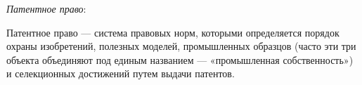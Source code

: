 \textit{Патентное право}:

Патентное право — система правовых норм, которыми определяется порядок охраны изобретений, полезных моделей, промышленных образцов (часто эти три объекта объединяют под единым названием — «промышленная собственность») и селекционных достижений путем выдачи патентов.
\\
